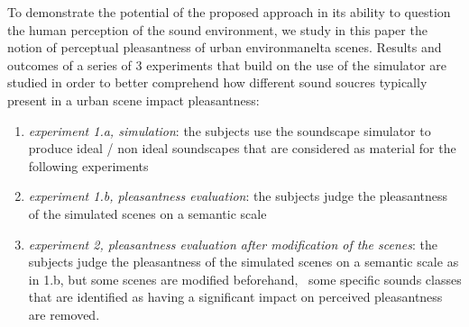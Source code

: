 \documentclass[twoside,twocolumn]{article}
\begin{document}


To demonstrate the potential of the proposed approach in its ability to question the human perception of the sound environment, we study in this paper the notion of perceptual pleasantness of urban environmanelta scenes. Results and outcomes of a series of 3 experiments that build on the use of the simulator are studied in order to better comprehend how different sound soucres typically present in a urban scene impact pleasantness:


\begin{enumerate}
\item \emph{experiment 1.a, simulation}:  the subjects use the soundscape simulator to produce ideal / non ideal soundscapes that are considered as material for the following experiments
\item \emph{experiment 1.b, pleasantness evaluation}: the subjects judge the pleasantness of the simulated scenes on a semantic scale
\item \emph{experiment 2, pleasantness evaluation after modification of the scenes}: the subjects judge the pleasantness of the simulated scenes on a semantic scale as in 1.b, but some scenes are modified beforehand, \ie~some specific sounds classes that are identified as having a significant impact on perceived pleasantness are removed.
\end{enumerate}
\end{document}
